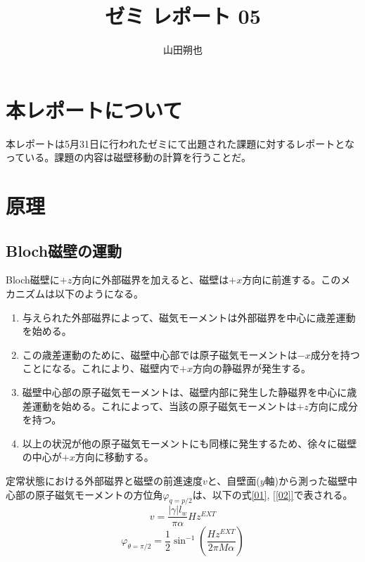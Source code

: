 \documentclass{jsarticle}
\begin{document}
\title{ゼミ レポート 05}
\author{山田朔也}
\maketitle

\section{本レポートについて}
本レポートは5月31日に行われたゼミにて出題された課題に対するレポートとなっている。課題の内容は磁壁移動の計算を行うことだ。

\section{原理}
\subsection{Bloch磁壁の運動}
Bloch磁壁に$+z$方向に外部磁界を加えると、磁壁は$+x$方向に前進する。このメカニズムは以下のようになる。
\begin{enumerate}
  \item 与えられた外部磁界によって、磁気モーメントは外部磁界を中心に歳差運動を始める。
  \item この歳差運動のために、磁壁中心部では原子磁気モーメントは$-x$成分を持つことになる。これにより、磁壁内で$+x$方向の静磁界が発生する。
  \item 磁壁中心部の原子磁気モーメントは、磁壁内部に発生した静磁界を中心に歳差運動を始める。これによって、当該の原子磁気モーメントは$+z$方向に成分を持つ。
  \item 以上の状況が他の原子磁気モーメントにも同様に発生するため、徐々に磁壁の中心が$+x$方向に移動する。
\end{enumerate}

定常状態における外部磁界と磁壁の前進速度$v$と、自壁面($y$軸)から測った磁壁中心部の原子磁気モーメントの方位角$\varphi_{q=p/2}$は、以下の式\ref{01}, \ref{[02]}で表される。
\begin{equation}
	v = \frac{\lvert\gamma\rvert l_w}{\pi\alpha}Hz^{EXT}
	\label{01}
\end{equation}
\begin{equation}
	\varphi_{\theta=\pi/2} = \frac{1}{2}\sin^{-1}(\frac{Hz^{EXT}}{2\pi M\alpha})
	\label{02}
\end{equation}
\end{document}
